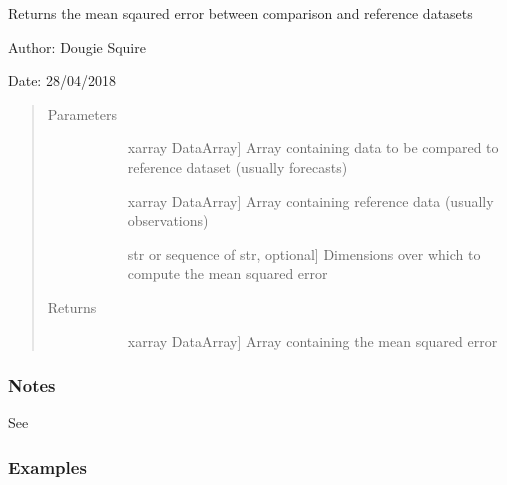 \documentclass[letterpaper,10pt,english]{sphinxmanual}
\begin{document}
\begin{fulllineitems}
\label{\detokenize{skill_doc:skill.mean_squared_error}}
Returns the mean sqaured error between comparison and reference datasets

\begin{DUlineblock}{0em}
\item[] Author: Dougie Squire
\item[] Date: 28/04/2018
\end{DUlineblock}
\begin{quote}\begin{description}
\item[{Parameters}] \leavevmode\begin{description}
\item[{}] \leavevmode{[}xarray DataArray{]}
Array containing data to be compared to reference dataset (usually forecasts)

\item[{}] \leavevmode{[}xarray DataArray{]}
Array containing reference data (usually observations)

\item[{}] \leavevmode{[}str or sequence of str, optional{]}
Dimensions over which to compute the mean squared error

\end{description}

\item[{Returns}] \leavevmode\begin{description}
\item[{}] \leavevmode{[}xarray DataArray{]}
Array containing the mean squared error

\end{description}

\end{description}\end{quote}
\subsubsection*{Notes}

See 
\subsubsection*{Examples}


\end{fulllineitems}
\end{document}
